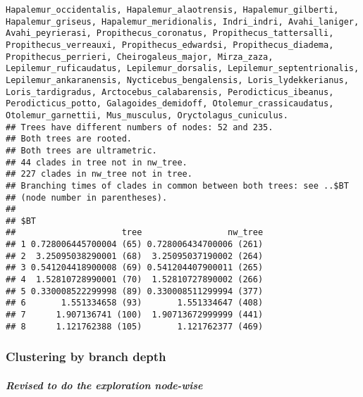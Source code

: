\documentclass[
]{article}
\begin{document}
\begin{verbatim}
Hapalemur_occidentalis, Hapalemur_alaotrensis, Hapalemur_gilberti, Hapalemur_griseus, Hapalemur_meridionalis, Indri_indri, Avahi_laniger, Avahi_peyrierasi, Propithecus_coronatus, Propithecus_tattersalli, Propithecus_verreauxi, Propithecus_edwardsi, Propithecus_diadema, Propithecus_perrieri, Cheirogaleus_major, Mirza_zaza, Lepilemur_ruficaudatus, Lepilemur_dorsalis, Lepilemur_septentrionalis, Lepilemur_ankaranensis, Nycticebus_bengalensis, Loris_lydekkerianus, Loris_tardigradus, Arctocebus_calabarensis, Perodicticus_ibeanus, Perodicticus_potto, Galagoides_demidoff, Otolemur_crassicaudatus, Otolemur_garnettii, Mus_musculus, Oryctolagus_cuniculus.
## Trees have different numbers of nodes: 52 and 235.
## Both trees are rooted.
## Both trees are ultrametric.
## 44 clades in tree not in nw_tree.
## 227 clades in nw_tree not in tree.
## Branching times of clades in common between both trees: see ..$BT
## (node number in parentheses).
## 
## $BT
##                     tree                 nw_tree
## 1 0.728006445700004 (65) 0.728006434700006 (261)
## 2  3.25095038290001 (68)  3.25095037190002 (264)
## 3 0.541204418900008 (69) 0.541204407900011 (265)
## 4  1.52810728990001 (70)  1.52810727890002 (266)
## 5 0.330008522299998 (89) 0.330008511299994 (377)
## 6       1.551334658 (93)       1.551334647 (408)
## 7      1.907136741 (100)  1.90713672999999 (441)
## 8      1.121762388 (105)       1.121762377 (469)
\end{verbatim}

\hypertarget{clustering-by-branch-depth}{%
\subsubsection{Clustering by branch
depth}\label{clustering-by-branch-depth}}

\hypertarget{revised-to-do-the-exploration-node-wise}{%
\subparagraph{Revised to do the exploration
node-wise}\label{revised-to-do-the-exploration-node-wise}}
\end{document}
